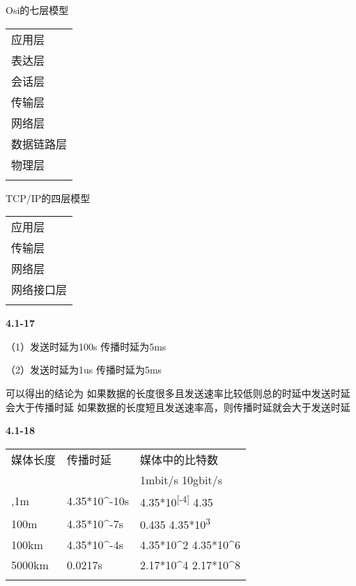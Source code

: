 \documentclass[
]{article}
\begin{document}
Osi的七层模型

\begin{longtable}[]{@{}l@{}}
\toprule
应用层 \\ \addlinespace
\midrule
\endhead
表达层 \\ \addlinespace
会话层 \\ \addlinespace
传输层 \\ \addlinespace
网络层 \\ \addlinespace
数据链路层 \\ \addlinespace
物理层 \\ \addlinespace
\bottomrule
\end{longtable}

TCP/IP的四层模型

\begin{longtable}[]{@{}l@{}}
\toprule
应用层 \\ \addlinespace
\midrule
\endhead
传输层 \\ \addlinespace
网络层 \\ \addlinespace
网络接口层 \\ \addlinespace
\bottomrule
\end{longtable}

\textbf{4.1-17}

（1）发送时延为100s 传播时延为5ms

（2）发送时延为1us 传播时延为5ms

可以得出的结论为
如果数据的长度很多且发送速率比较低则总的时延中发送时延会大于传播时延
如果数据的长度短且发送速率高，则传播时延就会大于发送时延

\textbf{4.1-18}

\begin{longtable}[]{@{}lll@{}}
\toprule
媒体长度 & 传播时延 & 媒体中的比特数 \\ \addlinespace
\midrule
\endhead
& & 1mbit/s 10gbit/s \\ \addlinespace
0,1m & 4.35*10\^{}-10s & 4.35*10\textsuperscript{{[}-4{]}}
4.35 \\ \addlinespace
100m & 4.35*10\^{}-7s & 0.435
4.35*10\textsuperscript{3} \\ \addlinespace
100km & 4.35*10\^{}-4s & 4.35*10\^{}2 4.35*10\^{}6 \\ \addlinespace
5000km & 0.0217s & 2.17*10\^{}4 2.17*10\^{}8 \\ \addlinespace
\bottomrule
\end{longtable}
\end{document}
